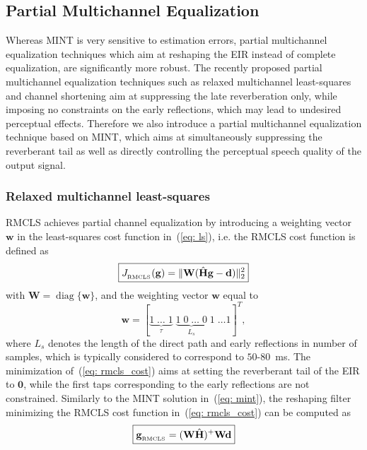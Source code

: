 \documentclass[draftcls,onecolumn,11pt]{IEEEtran}
\DeclareMathOperator{\diag}{diag}
\begin{document}
\subsection{Partial Multichannel Equalization}
\label{sec: partial}
Whereas MINT is very sensitive to estimation errors, partial multichannel equalization techniques which aim at reshaping the EIR instead of complete equalization, are significantly more robust.
The recently proposed partial multichannel equalization techniques such as relaxed multichannel least-squares and channel shortening aim at suppressing the late reverberation only, while imposing no constraints on the early reflections, which may lead to undesired perceptual effects.
Therefore we also introduce a partial multichannel equalization technique based on MINT, which aims at simultaneously suppressing the reverberant tail as well as directly controlling the perceptual speech quality of the output signal.

\subsubsection*{Relaxed multichannel least-squares~\cite{Zhang_IWAENC_2010}}
RMCLS achieves partial channel equalization by introducing a weighting vector $\mathbf{w}$ in the least-squares cost function in~(\ref{eq: ls}), i.e. the RMCLS cost function is defined as
\begin{equation}
\label{eq: rmcls_cost}
\boxed{J_{_{\rm RMCLS}}(\mathbf{g}) = \|\mathbf{W}(\hat{\mathbf{H}}\mathbf{g} - \mathbf{d})\|_2^2}
\end{equation}
with $\mathbf{W} = {\diag}\{\mathbf{w}\}$, and the weighting vector $\mathbf{w}$ equal to
\begin{equation}
\mathbf{w} = [\underbrace{1 \; \ldots \; 1}_{\tau} \; \underbrace{1 \; 0 \; \ldots \; 0}_{L_s} \; 1 \; \ldots 1]^{T},
\end{equation}
where $L_s$ denotes the length of the direct path and early reflections in number of samples, which is typically considered to correspond to $50$-$80$~ms. The minimization of~(\ref{eq: rmcls_cost}) aims at setting the reverberant tail of the EIR to $\mathbf{0}$, while the first taps corresponding to the early reflections are not constrained.
Similarly to the MINT solution in~(\ref{eq: mint}), the reshaping filter minimizing the RMCLS cost function in~(\ref{eq: rmcls_cost}) can be computed as
\begin{equation}
\boxed{\mathbf{g}_{{}_{\rm RMCLS}} = (\mathbf{W}\hat{\mathbf{H}})^{+}\mathbf{W}\mathbf{d}}
\end{equation}
\end{document}
